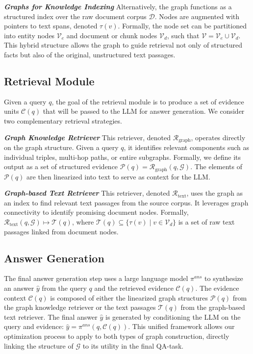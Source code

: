 \documentclass[11pt]{article}
\begin{document}
\textit{\textbf{Graphs for Knowledge Indexing}} Alternatively, the graph functions as a structured index over the raw document corpus $\mathcal{D}$. Nodes are augmented with pointers to text spans, denoted $\tau(v)$. Formally, the node set can be partitioned into entity nodes $\mathcal{V}_e$ and document or chunk nodes $\mathcal{V}_d$, such that $\mathcal{V} = \mathcal{V}_e \cup \mathcal{V}_d$. This hybrid structure allows the graph to guide retrieval not only of structured facts but also of the original, unstructured text passages.
\subsection{Retrieval Module}
Given a query $q$, the goal of the retrieval module is to produce a set of evidence units $\mathcal{C}(q)$ that will be passed to the LLM for answer generation. We consider two complementary retrieval strategies.

\textit{\textbf{Graph Knowledge Retriever}} This retriever, denoted $\mathcal{R}_{\text{graph}}$, operates directly on the graph structure. Given a query $q$, it identifies relevant components such as individual triples, multi-hop paths, or entire subgraphs. Formally, we define its output as a set of structured evidence $\mathcal{P}(q) = \mathcal{R}_{\text{graph}}(q, \mathcal{G})$. The elements of $\mathcal{P}(q)$ are then linearized into text to serve as context for the LLM.

\textit{\textbf{Graph-based Text Retriever}} This retriever, denoted $\mathcal{R}_{\text{text}}$, uses the graph as an index to find relevant text passages from the source corpus. It leverages graph connectivity to identify promising document nodes. Formally, $\mathcal{R}_{\text{text}}(q, \mathcal{G}) \mapsto \mathcal{T}(q)$, where $\mathcal{T}(q) \subseteq \{\tau(v) \mid v \in \mathcal{V}_d\}$ is a set of raw text passages linked from document nodes.

\subsection{Answer Generation}
The final answer generation step uses a large language model $\pi^{ans}$ to synthesize an answer $\hat{y}$ from the query $q$ and the retrieved evidence $\mathcal{C}(q)$. The evidence context $\mathcal{C}(q)$ is composed of either the linearized graph structures $\mathcal{P}(q)$ from the graph knowledge retriever or the text passages $\mathcal{T}(q)$ from the graph-based text retriever. The final answer $\hat{y}$ is generated by conditioning the LLM on the query and evidence: $\hat{y} = \pi^{ans}(q, \mathcal{C}(q))$. This unified framework allows our optimization process to apply to both types of graph construction, directly linking the structure of $\mathcal{G}$ to its utility in the final QA-task.
\end{document}
